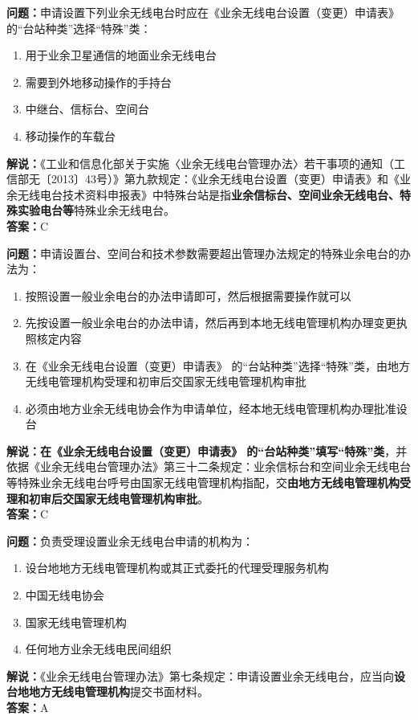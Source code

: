 \noindent\textbf{问题：}申请设置下列业余无线电台时应在《业余无线电台设置（变更）申请表》 的“台站种类”选择“特殊”类：
\begin{enumerate}[label=\Alph*), leftmargin=3em]
	\item 用于业余卫星通信的地面业余无线电台
	\item 需要到外地移动操作的手持台
	\item 中继台、信标台、空间台
	\item 移动操作的车载台
\end{enumerate}
\noindent\textbf{解说：}《工业和信息化部关于实施〈业余无线电台管理办法〉若干事项的通知（工信部无〔2013〕43号）》第九款规定：《业余无线电台设置（变更）申请表》和《业余无线电台技术资料申报表》中特殊台站是指\textbf{业余信标台、空间业余无线电台、特殊实验电台等}特殊业余无线电台。\\\noindent\textbf{答案：}C



\bigskip


\noindent\textbf{问题：}申请设置台、空间台和技术参数需要超出管理办法规定的特殊业余电台的办法为：
\begin{enumerate}[label=\Alph*), leftmargin=3em]
	\item 按照设置一般业余电台的办法申请即可，然后根据需要操作就可以
	\item 先按设置一般业余电台的办法申请，然后再到本地无线电管理机构办理变更执照核定内容
	\item 在《业余无线电台设置（变更）申请表》 的“台站种类”选择“特殊”类，由地方无线电管理机构受理和初审后交国家无线电管理机构审批
	\item 必须由地方业余无线电协会作为申请单位，经本地无线电管理机构办理批准设台
\end{enumerate}
\noindent\textbf{解说：}\textbf{在《业余无线电台设置（变更）申请表》 的“台站种类”填写“特殊”类}，并依据《业余无线电台管理办法》第三十二条规定：业余信标台和空间业余无线电台等特殊业余无线电台呼号由国家无线电管理机构指配，交\textbf{由地方无线电管理机构受理和初审后交国家无线电管理机构审批}。\\\noindent\textbf{答案：}C



\bigskip


\noindent\textbf{问题：}负责受理设置业余无线电台申请的机构为：
\begin{enumerate}[label=\Alph*), leftmargin=3em]
	\item 设台地地方无线电管理机构或其正式委托的代理受理服务机构
	\item 中国无线电协会
	\item 国家无线电管理机构
	\item 任何地方业余无线电民间组织
\end{enumerate}
\noindent\textbf{解说：}《业余无线电台管理办法》第七条规定：申请设置业余无线电台，应当向\textbf{设台地地方无线电管理机构}提交书面材料。\\\noindent\textbf{答案：}A


